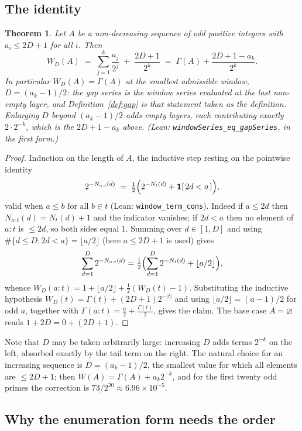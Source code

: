 \documentclass[11pt,a4paper]{article}
\theoremstyle{plain}
\newtheorem{theorem}{Theorem}[section]
\theoremstyle{definition}
\theoremstyle{remark}
\newcommand{\Lean}[1]{\texttt{#1}}
\begin{document}
\subsection{The identity}

\begin{theorem}\label{thm:window}
Let $A$ be a non-decreasing sequence of odd positive integers with $a_i\le2D+1$
for all $i$. Then
\[
  W_D(A)\;=\;\sum_{j=1}^{k}\frac{a_j}{2^{j}}\;+\;\frac{2D+1}{2^{k}}
        \;=\;\Gamma(A)+\frac{2D+1-a_k}{2^{k}}.
\]
In particular $W_D(A)=\Gamma(A)$ at the smallest admissible window,
$D=(a_k-1)/2$: \emph{the gap series is the window series evaluated at the last
non-empty layer}, and Definition~\ref{def:gap} is that statement taken as the
definition. Enlarging $D$ beyond $(a_k-1)/2$ adds empty layers, each
contributing exactly $2\cdot2^{-k}$, which is the $2D+1-a_k$ above.
\textup{(Lean: \Lean{windowSeries\_eq\_gapSeries}, in the first form.)}
\end{theorem}

\begin{proof}
Induction on the length of $A$, the inductive step resting on the pointwise
identity
\[
  2^{-N_{a:t}(d)}\;=\;\tfrac12\Bigl(2^{-N_{t}(d)}+\mathbf 1[\,2d<a\,]\Bigr),
\]
valid when $a\le b$ for all $b\in t$ (Lean: \Lean{window\_term\_cons}). Indeed
if $a\le2d$ then $N_{a:t}(d)=N_t(d)+1$ and the indicator vanishes; if $2d<a$
then no element of $a:t$ is $\le2d$, so both sides equal $1$. Summing over
$d\in[1,D]$ and using $\#\{d\le D:2d<a\}=\lfloor a/2\rfloor$ (here $a\le2D+1$ is
used) gives
\[
  \sum_{d=1}^{D}2^{-N_{a:t}(d)}
  =\tfrac12\Bigl(\sum_{d=1}^{D}2^{-N_t(d)}+\lfloor a/2\rfloor\Bigr),
\]
whence $W_D(a:t)=1+\lfloor a/2\rfloor+\tfrac12(W_D(t)-1)$. Substituting the
inductive hypothesis $W_D(t)=\Gamma(t)+(2D+1)2^{-|t|}$ and using
$\lfloor a/2\rfloor=(a-1)/2$ for odd $a$, together with
$\Gamma(a:t)=\tfrac a2+\tfrac{\Gamma(t)}2$, gives the claim. The base case
$A=\varnothing$ reads $1+2D=0+(2D+1)$.
\end{proof}

Note that $D$ may be taken arbitrarily large: increasing $D$ adds terms $2^{-k}$
on the left, absorbed exactly by the tail term on the right. The natural choice
for an increasing sequence is $D=(a_k-1)/2$, the smallest value for which all
elements are $\le2D+1$; then $W(A)=\Gamma(A)+a_k2^{-k}$, and for the first
twenty odd primes the correction is $73/2^{20}\approx6.96\times10^{-5}$.

\subsection{Why the enumeration form needs the order}\label{sec:order-matters}
\end{document}
